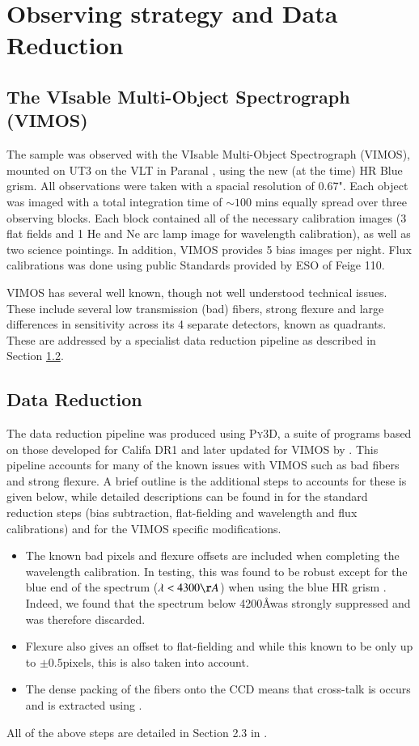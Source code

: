 \documentclass[fleqn,usenatbib,useAMS]{mnras}
\begin{document}
\section{Observing strategy and Data Reduction}
	\label{sec:obs}
	\subsection{The VIsable Multi-Object Spectrograph (VIMOS)}
		\label{subsec:VIMOS}
		The sample was observed with the VIsable Multi-Object Spectrograph (VIMOS), mounted on UT3 on the VLT in Paranal \citep{LeFevre2003}, using the new (at the time) HR Blue grism. All observations were taken with a spacial resolution of 0.67". Each object was imaged with a total integration time of $\sim 100$ mins equally spread over three observing blocks. Each block contained all of the necessary calibration images (3 flat fields and 1 He and Ne arc lamp image for wavelength calibration), as well as two science pointings. In addition, VIMOS provides 5 bias images per night. Flux calibrations was done using public Standards provided by ESO of Feige 110.

		VIMOS has several well known, though not well understood technical issues. These include several low transmission (bad) fibers, strong flexure and large differences in sensitivity across its 4 separate detectors, known as quadrants. These are addressed by a specialist data reduction pipeline as described in Section \ref{subsec:reduct}. 

	\subsection{Data Reduction}
		\label{subsec:reduct}
		The data reduction pipeline was produced using \textsc{Py3D}, a suite of programs based on those developed for Califa DR1 \citep{Sanchez2011, Husemann2013} and later updated for VIMOS by \citet{Husemann2014}. This pipeline accounts for many of the known issues with VIMOS such as bad fibers and strong flexure. A brief outline is the additional steps to accounts for these is given below, while detailed descriptions can be found in \citet{Sanchez2011} for the standard reduction steps (bias subtraction, flat-fielding and wavelength and flux calibrations) and \citep{Husemann2014} for the VIMOS specific modifications. 
		\begin{itemize}
		\item The known bad pixels and flexure offsets are included when completing the wavelength calibration. In testing, this was found to be robust except for the blue end of the spectrum ($\lambda < 4300 \AA$) when using the blue HR grism \citep{Husemann2014}. Indeed, we found that the spectrum below 4200\AA was strongly suppressed and was therefore discarded.
		\item Flexure also gives an offset to flat-fielding and while this known to be only up to $\pm0.5$pixels, this is also taken into account.
		\item The dense packing of the fibers onto the CCD means that cross-talk is occurs and is extracted using \citep{Horne1986}. 
		\end{itemize}
		All of the above steps are detailed in Section 2.3 in \citet{Husemann2014}.
\end{document}
